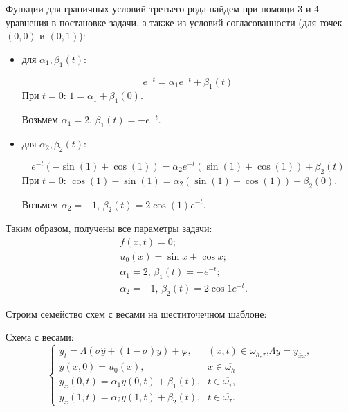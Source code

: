 Функции для граничных условий третьего рода найдем при помощи 3 и 4 уравнения в постановке задачи, а также из условий согласованности (для точек $(0,0)$ и $(0,1)$):
\begin{itemize}
\item { для $\alpha_{1}, \beta_{1}(t)$: \par
\begin{equation*}
e^{-t}=\alpha_{1}e^{-t} + \beta_{1}(t)
\end{equation*}
При $t=0$: $1=\alpha_{1} + \beta_{1}(0)$. \par
Возьмем $\alpha_{1}=2$, $\beta_{1}(t)=-e^{-t}$.
}
\item { для $\alpha_{2}, \beta_{2}(t)$: \par
\begin{equation*}
e^{-t}(-\sin(1)+\cos(1))=\alpha_{2}e^{-t}(\sin(1)+\cos(1)) + \beta_{2}(t)
\end{equation*}
При $t=0$: $\cos(1)-\sin(1)=\alpha_{2}(\sin(1)+\cos(1)) + \beta_{2}(0)$. \par
Возьмем $\alpha_{2}=-1$, $\beta_{2}(t)=2\cos(1)e^{-t}$.
}
\end{itemize}
Таким образом, получены все параметры задачи:
\begin{eqnarray}
& f(x,t)=0\text{;} \nonumber \\
& u_{0}(x)=\sin x + \cos x\text{;} \\
& \alpha_{1}=2\text{, }\beta_{1}(t)=-e^{-t}\text{;} \nonumber \\
& \alpha_{2}=-1\text{, }\beta_{2}(t)=2\cos 1 e^{-t}\text{.} \nonumber
\end{eqnarray} \par

Строим семейство схем с весами на шеститочечном шаблоне:

Схема с весами:
\begin{equation}
\left\{
\begin{array}{ll}
y_{t} = \Lambda (\sigma \hat{y} + (1-\sigma)y) + \varphi \text{,} & (x,t)\in \omega_{h,\tau} \text{,} \Lambda y = y_{\bar{x}x} \text{,} \\
y(x,0) = u_{0}(x) \text{,} & x \in \overline{\omega_{h}} \\
y_{x}(0,t) = \alpha_{1}y(0,t)+\beta_{1}(t)\text{,} & t \in \overline{\omega_{\tau}} \text{,} \\
y_{\bar{x}}(1,t) = \alpha_{2}y(1,t)+\beta_{2}(t)\text{,} & t \in \overline{\omega_{\tau}} \text{.}
\end{array}
\right.
\end{equation}

